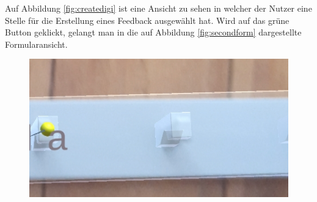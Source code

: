 Auf Abbildung \ref{fig:createdigi} ist eine Ansicht zu sehen in welcher der Nutzer eine Stelle für die Erstellung eines Feedback ausgewählt hat. Wird auf das grüne Button geklickt, gelangt man 
in die auf Abbildung \ref{fig:secondform} dargestellte Formularansicht. 

\begin{figure}[H]
	\label{tab:example}
	\centering
	\begin{minipage}{.45\textwidth}
		\centering
		\includegraphics[width=.85\textwidth]{resources/implementation/ueberlagerung.png}
		\label{fig:ueberlagerung}
	\end{minipage}%
	\begin{minipage}{.45\textwidth}
		\centering

\end{minipage}
\end{figure}
